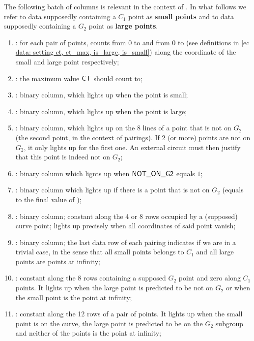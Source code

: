 The following batch of columns is relevant in the context of .
In what follows we refer to data supposedly containing a $C_1$ point as \textbf{small points} and to data supposedly containing a $G_2$ point as \textbf{large points}.
\begin{enumerate}[resume]
      \item \ct:
            for each pair of points, counts from 0 to \ctMaxSmallPoint{} and from 0 to \ctMaxLargePoint{} (see definitions in \ref{ec data: setting ct, ct_max, is_large, is_small}) along the coordinate of the small and large point respectively;
      \item \maxCt:
            the maximum value $\textsf{CT}$ should count to;
      \item \isSmallPoint:
            binary column, which lights up when the point is small;
      \item \isLargePoint:
            binary column, which lights up when the point is large;
      \item \notOnGTwo{} \ecDataPrediction{}:
            binary column, which lights up on the 8 lines of a point that is not on $G_2$ (the second point, in the context of pairings). If 2 (or more) points are not on $G_2$, it only lights up for the first one. An external circuit must then justify that this point is indeed not on $G_2$;
      \item \notOnGTwoAcc:
            binary column which lignts up when $\textsf{NOT\_ON\_G2}$ equals $1$;
      \item \notOnGTwoAccMax:
            binary column which lights up if there is a point that is not on $G_2$ (equals to the final value of \notOnGTwoAcc);
      \item \isInfinity:
            binary column;
            constant along the 4 or 8 rows occupied by a (supposed) curve point;
            lights up precisely when all coordinates of said point vanish;
      \item \both{\trivialPairing}: binary column; the last data row of each pairing indicates if we are in a trivial case, in the sense that all small points belongs to $C_1$ and all large points are points at infinity;
      \item \both{\membershipTestRequired}:
            constant along the 8 rows containing a supposed $G_2$ point and zero along $C_1$ points. It lights up when the large point is predicted to be not on $G_2$ or when the small point is the point at infinity;
      \item \both{\acceptablePairOfPoints}:
            constant along the 12 rows of a pair of points. It lights up when the small point is on the curve, the large point is predicted to be on the $G_2$ subgroup and neither of the points is the point at infinity;
\end{enumerate}

